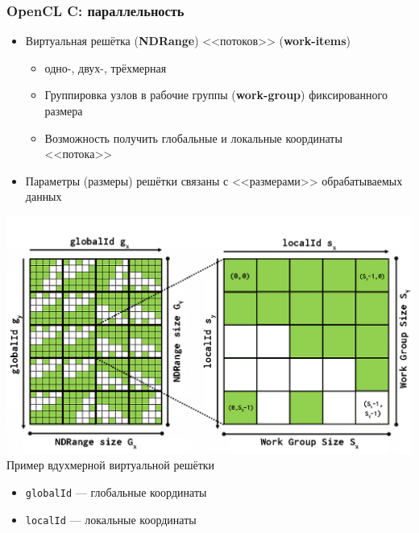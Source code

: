 \documentclass[xcolor=table,aspectratio=169]{beamer}
\begin{document}
\begin{frame}[fragile]
  \frametitle{OpenCL C: параллельность}
  \begin{minipage}[t]{0.5\textwidth}
  \begin{itemize}
    \item Виртуальная решётка (\textbf{NDRange}) <<потоков>> (\textbf{work-items})
    \begin{itemize}
      \item одно-, двух-, трёхмерная
      \item Группировка узлов в рабочие группы (\textbf{work-group}) фиксированного размера
      \item Возможность получить глобальные и локальные координаты <<потока>>
    \end{itemize}
    \item Параметры (размеры) решётки связаны с <<размерами>> обрабатываемых данных
  \end{itemize}
\end{minipage}
\begin{minipage}[t]{0.48\textwidth}
  \begin{center}
    \vspace{-1cm}
  \includegraphics[valign=t,width=\textwidth]{pictures/opeclmap4.png}
  Пример вдухмерной виртуальной решётки\footnotemark
  \end{center}
  \begin{itemize}
    \item \texttt{globalId} --- глобальные координаты
    \item \texttt{localId} --- локальные координаты
  \end{itemize}
\end{minipage}
\end{frame}
\end{document}
